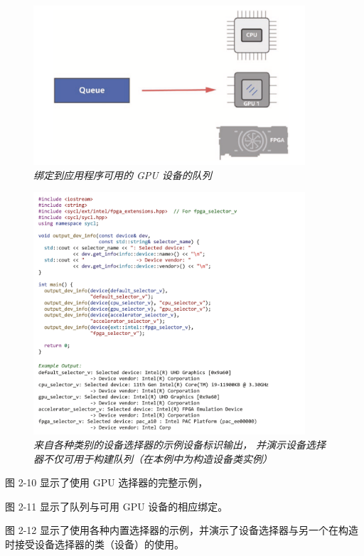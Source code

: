 \begin{figure}[H]
	\centering
	\includegraphics[width=0.9\textwidth]{figs/F2.11.png}
	\caption{\textit{绑定到应用程序可用的 GPU 设备的队列}}
\end{figure}

\begin{figure}[H]
	\centering
	\includegraphics[width=0.9\textwidth]{figs/F2.12.png}
	\caption{\textit{来自各种类别的设备选择器的示例设备标识输出，
	并演示设备选择器不仅可用于构建队列（在本例中为构造设备类实例）}}
\end{figure}

图 2-10 显示了使用 GPU 选择器的完整示例，

图 2-11 显示了队列与可用 GPU 设备的相应绑定。

图 2-12 显示了使用各种内置选择器的示例，并演示了设备选择器与另一个在构造时接受设备选择器的类（设备）的使用。

